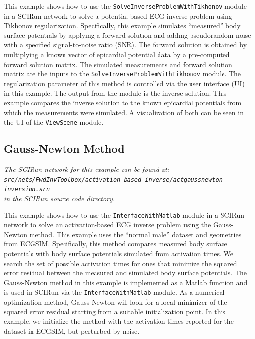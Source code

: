\documentclass[fleqn,11pt,openany]{book}
\begin{document}
This example shows how to use the {\tt SolveInverseProblemWithTikhonov} module in a SCIRun network to solve a potential-based ECG inverse problem using Tikhonov regularization. Specifically, this example simulates ``measured'' body surface potentials by applying a forward solution and adding pseudorandom noise with a specified signal-to-noise ratio (SNR). The forward solution is obtained by multiplying a known vector of epicardial potential data by a pre-computed forward solution matrix. The simulated measurements and forward solution matrix are the inputs to the {\tt SolveInverseProblemWithTikhonov} module. The regularization parameter of this method is controlled via the user interface (UI) in this example. The output from the module is the inverse solution. This example compares the inverse solution to the known epicardial potentials from which the measurements were simulated. A visualization of both can be seen in the UI of the {\tt ViewScene} module.

\subsection{Gauss-Newton Method}

\vspace{5pt}\textit{The SCIRun network for this example can be found at:\\{\tt src/nets/FwdInvToolbox/activation-based-inverse/actgaussnewton-inversion.srn}\\in the SCIRun source code directory.}\vspace{5pt}

This example shows how to use the {\tt InterfaceWithMatlab} module in a SCIRun network to solve an activation-based ECG inverse problem using the Gauss-Newton method. This example uses the ``normal male'' dataset and geometries from ECGSIM. Specifically, this method compares measured body surface potentials with body surface potentials simulated from activation times. We search the set of possible activation times for ones that minimize the squared error residual between the measured and simulated body surface potentials. The Gauss-Newton method in this example is implemented as a Matlab function and is used in SCIRun via the {\tt InterfaceWithMatlab} module. As a numerical optimization method, Gauss-Newton will look for a local minimizer of the squared error residual starting from a suitable initialization point. In this example, we initialize the method with the activation times reported for the dataset in ECGSIM, but perturbed by noise.
\end{document}

